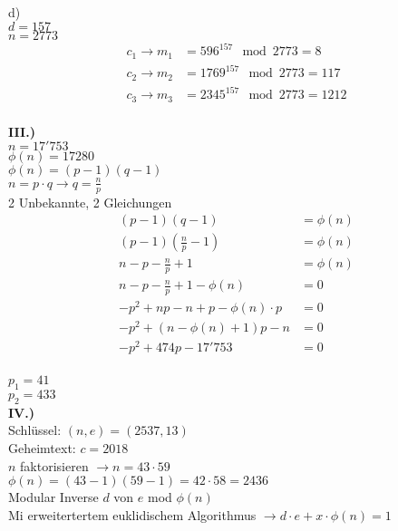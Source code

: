 \documentclass[12pt]{scrartcl}
\begin{document}
\vspace{0.5cm}
d)\\
$d = 157$\\
$n = 2773$
\begin{align*}
    c_1 \rightarrow m_1 &= 596^{157} \mod 2773 = 8\\
    c_2 \rightarrow m_2 &= 1769^{157} \mod 2773 = 117\\
    c_3 \rightarrow m_3 &= 2345^{157} \mod 2773 = 1212\\
\end{align*}


\textbf{III.)}\\
$n = 17'753$\\
$\phi (n) = 17280$\\

$\phi (n) = (p-1)(q-1)$\\
$n = p \cdot q \rightarrow q = \frac{n}{p}$\\

2 Unbekannte, 2 Gleichungen\\
\begin{align*}
    (p-1)(q-1)                                  &= \phi (n)\\
    (p-1)\left(\frac{n}{p}-1\right)             &= \phi (n)\\
    n - p - \frac{n}{p} + 1                     &= \phi (n)\\
    n - p - \frac{n}{p} + 1 - \phi (n)          &= 0\\
    -p^2 + np - n + p - \phi (n) \cdot p        &= 0\\
    -p^2 + (n - \phi (n) + 1)p - n              &= 0\\
    -p^2 + 474p - 17'753                        &= 0\\
\end{align*}

$p_1 = 41$\\
$p_2 = 433$\\


\vspace{0.5cm}
\textbf{IV.)}\\
Schlüssel: $(n, e) = (2537, 13)$\\
Geheimtext: $c = 2018$\\

$n$ faktorisieren $\rightarrow n = 43 \cdot 59$\\
$\phi (n) = (43-1)(59-1) = 42 \cdot 58 = 2436$\\

Modular Inverse $d$ von $e$ mod $\phi (n)$\\
Mi erweitertertem euklidischem Algorithmus $\rightarrow d \cdot e + x \cdot \phi (n) = 1$\\
\end{document}
